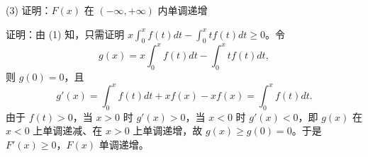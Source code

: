 (3) 证明：\(F(x)\) 在 \((-\infty,+\infty)\) 内单调递增

证明：由 (1) 知，只需证明 \(x\int_{0}^{x}f(t)dt-\int_{0}^{x}tf(t)dt\ge0\)。令
\[ g(x)=x\int_{0}^{x}f(t)dt-\int_{0}^{x}tf(t)dt, \]
则 \(g(0)=0\)，且
\[ g'(x)=\int_{0}^{x}f(t)dt+xf(x)-xf(x)=\int_{0}^{x}f(t)dt. \]
由于 \(f(t)>0\)，当 \(x>0\) 时 \(g'(x)>0\)，当 \(x<0\) 时 \(g'(x)<0\)，即 \(g(x)\) 在 \(x<0\) 上单调递减、在 \(x>0\) 上单调递增，故 \(g(x)\ge g(0)=0\)。于是 \(F'(x)\ge0\)，\(F(x)\) 单调递增。
